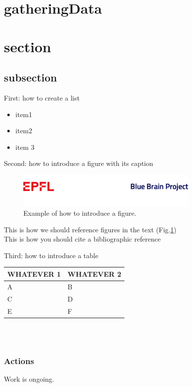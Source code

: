 
\section{gatheringData}

\section{section}

\subsection{subsection}

First: how to create a list
\begin{itemize}
\item item1
\item item2
\item item 3
\end{itemize}

Second: how to introduce a figure with its caption
\begin{figure}[h!]
\includegraphics[width=0.8\textwidth]{figs/Last.png}
\caption{Example of how to introduce a figure.}
\label{fig_test}
\end{figure}


This is how we should reference figures in the text (Fig.\ref{fig_test}) \\

This is how you should cite a bibliographic reference \citet{richardson2008measurement}

Third: how to introduce a table\\


\begin{tabular}{ | p{5cm} | p{5cm} |}\hline
WHATEVER 1 & WHATEVER 2 \\ \hline
A & B\\ \hline
C & D\\ \hline
E & F\\ \hline
\end{tabular}\\ \\


\subsubsection{Actions}
Work is ongoing.

